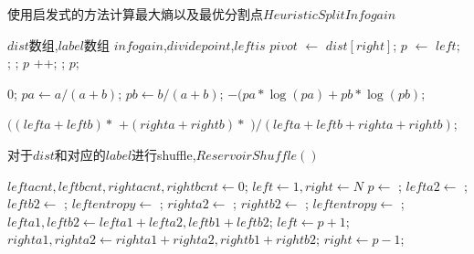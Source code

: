 \begin{algorithm}
	\caption{使用启发式的方法计算最大熵以及最优分割点$HeuristicSplitInfogain${\color{red}{这个伪代码检查一下0和1,可能需要重新设计}}}
	\label{alg:HeuristicSplitInfogain}
	\begin{algorithmic}[1]
	\Require $dist$数组,$label$数组
	\Ensure $infogain$,$dividepoint$,$leftis$
		\State $pivot$ $\gets$ $dist[right]$;
		\State $p$ $\gets$ $left$;
				\State {};
				\State {};
				\State $p$ ++;
			\EndIf
		\EndFor
		\State {};
		\State \Return $p$;
	\EndFunction
	
			\Return $0$;
		\EndIf
		\State $pa \gets a/(a+b)$;
		\State $pb \gets b/(a+b)$;
		\State \Return $-(pa*\log(pa)+pb*\log(pb)$;
	\EndFunction
	
		\State \Return $((lefta + leftb)*$ $+(righta+rightb)*$  $)/(lefta+leftb+righta+rightb)$;
 	\EndFunction
	\end{algorithmic}
\end{algorithm}

\begin{algorithm}
	\caption{对于$dist$和对应的$label$进行shuffle,$ReservoirShuffle()$}
	\label{alg:HeuristicSplitInfogain2}
	\begin{algorithmic}[1]
		\State $leftacnt,leftbcnt,rightacnt,rightbcnt \gets 0$;
		\State $left \gets 1,right \gets N$
			\State $p \gets $ ;
			\State $lefta2 \gets $ ;
			\State $leftb2 \gets $ ;
			\State $leftentropy \gets $ ;
			\State $righta2 \gets $ ;
			\State $rightb2 \gets $ ;
			\State $leftentropy \gets $ ;
				\State $lefta1,leftb2 \gets lefta1 + lefta2,leftb1+leftb2$;
				\State $left \gets p+1$;
			\Else
				\State $righta1,righta2 \gets righta1 + righta2,rightb1+rightb2$;
				\State $right \gets p-1$;
			\EndIf
			
		\EndWhile
	\EndFunction
	\end{algorithmic}
\end{algorithm}




